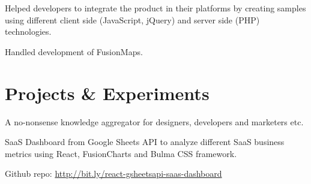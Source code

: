 \documentclass[]{gagan-resume}
\begin{document}
\begin{minipage}[t]{0.65\textwidth}
\vspace{\topsep}
\begin{tightemize}
\item Helped developers to integrate the product in their platforms by creating samples using different client side (JavaScript, jQuery) and server side (PHP) technologies.
\item Handled development of FusionMaps.
\end{tightemize}
\sectionsep




\section{Projects \& Experiments}
 
\vspace{\topsep}
\begin{tightemize}
\item A no-nonsense knowledge aggregator for designers, developers and marketers etc.
\end{tightemize}
\sectionsep

\vspace{\topsep}
\begin{tightemize}
\item SaaS Dashboard from Google Sheets API to analyze different SaaS business metrics using React, FusionCharts and Bulma CSS framework.
\item Github repo: \href{http://bit.ly/react-gsheetsapi-saas-dashboard}{http://bit.ly/react-gsheetsapi-saas-dashboard}
\end{tightemize}
\sectionsep



\end{minipage} 
\end{document}
